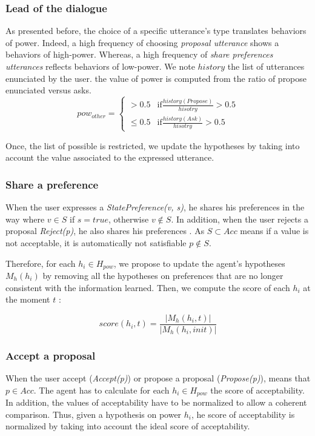 \documentclass[sigconf]{aamas}  %
\begin{document}
	
	\subsubsection{Lead of the dialogue}		
	As presented before, the choice of a specific utterance's type translates behaviors of power. Indeed, a high frequency of choosing \emph{proposal utterance} shows a behaviors of high-power. Whereas, a high frequency of \emph{share preferences utterances} reflects behaviors of low-power.
	We note $history$ the list of utterances enunciated by the user. the value of power is computed from the ratio of propose enunciated versus asks.
	\begin{equation}
	pow_{other} = \left\{\begin{array}{ll}
	> 0.5 & \mathrm{if } \frac{history(Propose)}{hisotry} > 0.5\\
	\leq 0.5 & \mathrm{if  } \frac{history(Ask)}{hisotry} > 0.5
	\end{array}\right.
	\end{equation}
	
	Once, the list of possible is restricted, we update the hypotheses by taking into account the value associated to the expressed utterance.
	
	\subsubsection{Share a preference}
	When the user expresses a \emph{StatePreference(v, s)}, he shares his preferences in the way where $v \in S$ if $s =true$, otherwise $v \notin S$. 
	In addition, when the user rejects a proposal \emph{Reject(p)}, he also shares his preferences . As $S \subset Acc$ means if a value is not acceptable, it is automatically not satisfiable $p \notin S$. 
	
	Therefore, for each  $h_i \in H_{pow}$, we propose to update the agent's hypotheses $M_h(h_i)$ by removing all the hypotheses on preferences that are no longer consistent with the information learned. 
	Then, we compute the score of each $h_i$ at the moment $t$ :
	
	$$score(h_i,t) = \frac{|M_h(h_i, t)|}{|M_h(h_i, init)|}$$
	
	
	\subsubsection{Accept a proposal}
	When the user accept (\emph{Accept(p)}) or propose a proposal (\emph{Propose(p)}), means that $p \in Acc$. 
	The agent has to calculate for each $h_i \in H_{pow}$ the score of acceptability. In addition, the values of acceptability have to be normalized to allow a coherent comparison. Thus, given a hypothesis on power $h_i$, he score of acceptability is normalized by taking into account the ideal score of acceptability.
	
\end{document}
